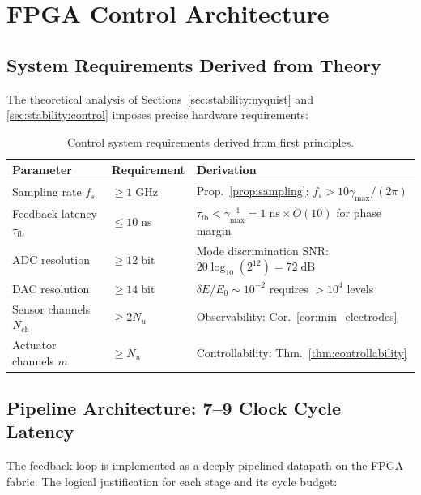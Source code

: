 \documentclass[12pt,twocolumn]{article}
\begin{document}
\section{FPGA Control Architecture}
\label{sec:fpga}

\subsection{System Requirements Derived from Theory}

The theoretical analysis of Sections~\ref{sec:stability:nyquist}
and \ref{sec:stability:control} imposes precise hardware requirements:

\begin{table}[h]
\centering
\caption{Control system requirements derived from first principles.}
\label{tab:requirements}
\begin{tabular}{@{}llp{3.8cm}@{}}
\toprule
\textbf{Parameter} & \textbf{Requirement} & \textbf{Derivation} \\
\midrule
Sampling rate $f_s$
  & $\geq 1\;\mathrm{GHz}$
  & Prop.~\ref{prop:sampling}: $f_s > 10\gamma_{\max}/(2\pi)$ \\
Feedback latency $\tau_{\mathrm{fb}}$
  & $\leq 10\;\mathrm{ns}$
  & $\tau_{\mathrm{fb}} < \gamma_{\max}^{-1} = 1\;\mathrm{ns}
    \times O(10)$ for phase margin \\
ADC resolution
  & $\geq 12\;\mathrm{bit}$
  & Mode discrimination SNR: $20\log_{10}(2^{12}) = 72\;\mathrm{dB}$ \\
DAC resolution
  & $\geq 14\;\mathrm{bit}$
  & $\delta E/E_0 \sim 10^{-2}$ requires $> 10^{4}$ levels \\
Sensor channels $N_{\mathrm{ch}}$
  & $\geq 2 N_u$
  & Observability: Cor.~\ref{cor:min_electrodes} \\
Actuator channels $m$
  & $\geq N_u$
  & Controllability: Thm.~\ref{thm:controllability} \\
\bottomrule
\end{tabular}
\end{table}

\subsection{Pipeline Architecture: 7--9 Clock Cycle Latency}
\label{sec:fpga:pipeline}

The feedback loop is implemented as a deeply pipelined datapath on
the FPGA fabric. The logical justification for each stage and its
cycle budget:
\end{document}
